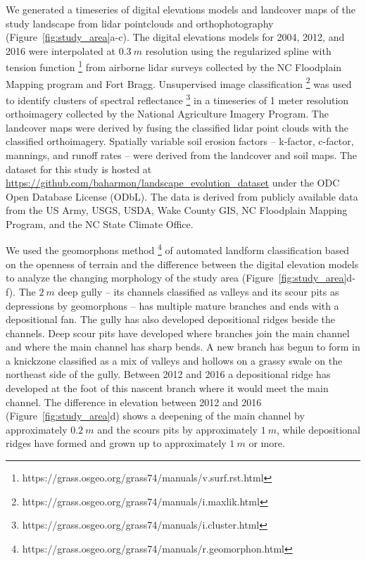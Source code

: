 \documentclass[esurf, manuscript]{copernicus}
\begin{document}
We generated a timeseries of 
digital elevations models and landcover maps 
of the study landscape
from lidar pointclouds and orthophotography
(Figure~\ref{fig:study_area}a-c). 
The digital elevations models for 2004, 2012, and 2016
were interpolated at $0.3~m$ resolution
using the regularized spline with tension function \citep{Mitasova1993,Mitasova2005}
\footnote{https://grass.osgeo.org/grass74/manuals/v.surf.rst.html}
from %
airborne lidar surveys 
collected by the NC Floodplain Mapping program and Fort Bragg. 
%
Unsupervised image classification 
\footnote{https://grass.osgeo.org/grass74/manuals/i.maxlik.html}
was used to identify clusters of spectral reflectance
\footnote{https://grass.osgeo.org/grass74/manuals/i.cluster.html}
in a timeseries of 1 meter resolution orthoimagery 
collected by the National Agriculture Imagery Program.
The landcover maps were derived by fusing the
classified lidar point clouds with the classified orthoimagery.
Spatially variable soil erosion factors 
-- k-factor, c-factor, mannings, and runoff rates --
were derived from the landcover and soil maps.
The dataset for this study is hosted at 
\url{https://github.com/baharmon/landscape\_evolution_dataset}
under the ODC Open Database License (ODbL).
The data is derived from publicly available data from
the US Army, USGS, USDA, Wake County GIS, NC Floodplain
Mapping Program, and the NC State Climate Office.

We used the geomorphons method 
\footnote{https://grass.osgeo.org/grass74/manuals/r.geomorphon.html}
of automated landform classification
based on the openness of terrain \citep{Jasiewicz2013}
and the difference between the digital elevation models 
to analyze the changing morphology of the study area
(Figure~\ref{fig:study_area}d-f). 
%
The $2~m$ deep gully -- 
its channels classified as valleys and 
its scour pits as depressions by geomorphons -- 
has multiple mature branches
and ends with a depositional fan.
%
The gully has also developed 
depositional ridges beside the channels.
Deep scour pits have developed 
where branches join the main channel 
and where the main channel has sharp bends.
%
A new branch has begun to form 
in a knickzone classified as a mix of valleys and hollows
on a grassy swale on the northeast side of the gully.
Between 2012 and 2016 a depositional ridge
has developed at the foot of this nascent branch
where it would meet the main channel. 
%
The difference in elevation between 2012 and 2016
(Figure~\ref{fig:study_area}d)
shows a deepening of the main channel 
by approximately $0.2~m$ 
and the scours pits
by approximately $1~m$,
while depositional ridges have formed and grown up to
approximately $1~m$ or more.
\end{document}

